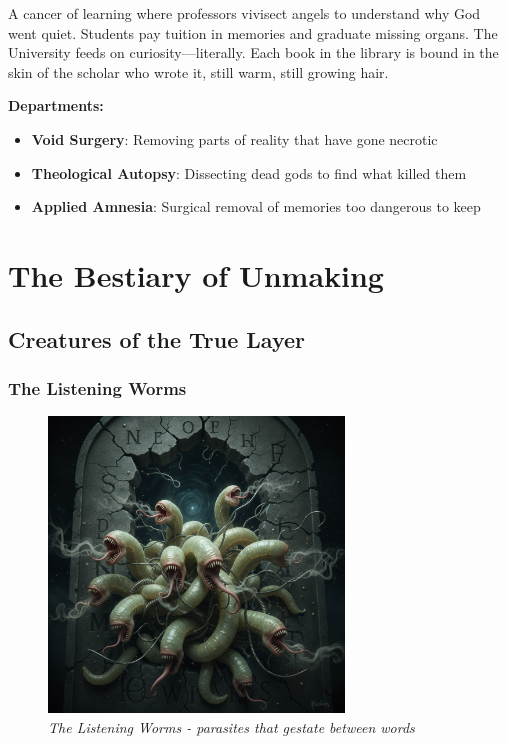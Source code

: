 \documentclass[11pt,a4paper,twoside]{book}
\begin{document}
A cancer of learning where professors vivisect angels to understand why God went quiet. Students pay tuition in memories and graduate missing organs. The University feeds on curiosity—literally. Each book in the library is bound in the skin of the scholar who wrote it, still warm, still growing hair.

\textbf{Departments:}
\begin{itemize}
    \item \textbf{Void Surgery}: Removing parts of reality that have gone necrotic
    \item \textbf{Theological Autopsy}: Dissecting dead gods to find what killed them
    \item \textbf{Applied Amnesia}: Surgical removal of memories too dangerous to keep
\end{itemize}

\part{The Bestiary of Unmaking}

\chapter{Creatures of the True Layer}

\section{The Listening Worms}

\begin{figure}[h]
\centering
\includegraphics[width=0.7\textwidth]{images/listening_worms_2025-09-03T22-31-43-701Z_1.png}
\caption*{\textit{The Listening Worms - parasites that gestate between words}}
\end{figure}
\end{document}
